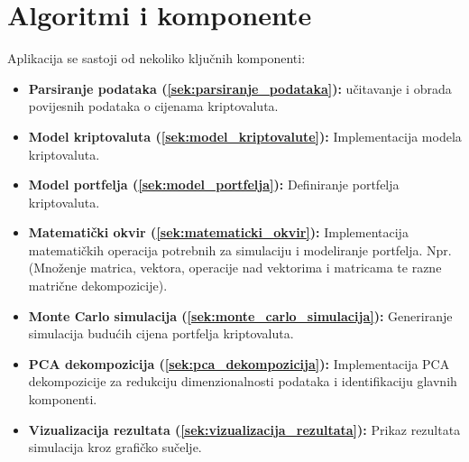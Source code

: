 \documentclass[zavrsnirad]{fer}
\begin{document}
\section{Algoritmi i komponente}
\label{sek:algoritmi_i_komponente}
Aplikacija se sastoji od nekoliko ključnih komponenti:
\begin{itemize}
    \item \textbf{Parsiranje podataka (\ref{sek:parsiranje_podataka}):} učitavanje i obrada povijesnih
    podataka o cijenama kriptovaluta.

\item \textbf{Model kriptovaluta (\ref{sek:model_kriptovalute}):} Implementacija modela kriptovaluta.

    \item \textbf{Model portfelja (\ref{sek:model_portfelja}):} Definiranje portfelja kriptovaluta.

    \item \textbf{Matematički okvir (\ref{sek:matematicki_okvir}):} Implementacija matematičkih
    operacija potrebnih za simulaciju i modeliranje portfelja. Npr.
        (Množenje matrica, vektora, operacije nad vektorima i matricama te
        razne matrične dekompozicije).

    \item \textbf{Monte Carlo simulacija (\ref{sek:monte_carlo_simulacija}):} Generiranje simulacija
    budućih cijena portfelja kriptovaluta.

    \item \textbf{PCA dekompozicija (\ref{sek:pca_dekompozicija}):} Implementacija PCA dekompozicije
    za redukciju dimenzionalnosti podataka i identifikaciju glavnih
    komponenti.

    \item \textbf{Vizualizacija rezultata (\ref{sek:vizualizacija_rezultata}):} Prikaz rezultata simulacija
    kroz grafičko sučelje.
\end{itemize}
\end{document}
